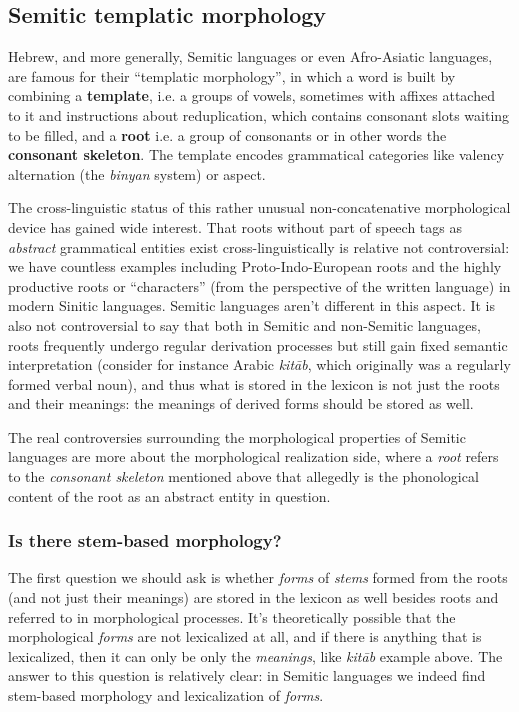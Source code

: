 \documentclass[a4paper, oneside, 12pt]{report}
\newcommand*{\concept}[1]{\textbf{#1}}
\newcommand*{\term}[1]{\emph{#1}}
\newcommand{\form}[1]{\emph{#1}}
\begin{document}
\subsection{Semitic templatic morphology}

Hebrew, and more generally, Semitic languages or even Afro-Asiatic languages,
are famous for their ``templatic morphology'',
in which a word is built by combining a \concept{template},
i.e. a groups of vowels, sometimes with affixes attached to it and instructions about reduplication,
which contains consonant slots waiting to be filled,
and a \concept{root} i.e. a group of consonants or in other words the \concept{consonant skeleton}.
The template encodes grammatical categories like valency alternation
(the \form{binyan} system) or aspect.

The cross-linguistic status of this rather unusual non-concatenative morphological device has gained wide interest.
That roots without part of speech tags as \emph{abstract} grammatical entities exist cross-linguistically
is relative not controversial:
we have countless examples including Proto-Indo-European roots
and the highly productive roots or ``characters'' (from the perspective of the written language) in modern Sinitic languages.
Semitic languages aren't different in this aspect.
It is also not controversial to say that both in Semitic and non-Semitic languages,
roots frequently undergo regular derivation processes
but still gain fixed semantic interpretation
(consider for instance Arabic \form{kitāb}, which originally was a regularly formed verbal noun),
and thus what is stored in the lexicon is not just the roots and their meanings:
the meanings of derived forms should be stored as well.

The real controversies surrounding the morphological properties of Semitic languages
are more about the morphological realization side,
where a \term{root} refers to the \emph{consonant skeleton} mentioned above
that allegedly is the phonological content of the root as an abstract entity in question.

\subsubsection{Is there stem-based morphology?}

The first question we should ask is whether \emph{forms} of \emph{stems} formed from the roots (and not just their meanings) are stored in the lexicon as well besides roots
and referred to in morphological processes.
It's theoretically possible that the morphological \emph{forms} are not lexicalized at all,
and if there is anything that is lexicalized,
then it can only be only the \emph{meanings},
like \form{kitāb} example above.
The answer to this question is relatively clear:
in Semitic languages we indeed find stem-based morphology and lexicalization of \form{forms}.
\end{document}
